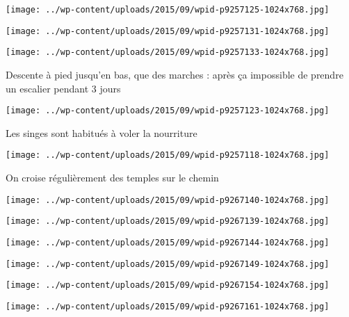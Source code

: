  \newline
\centerline{\texttt{[image: ../wp-content/uploads/2015/09/wpid-p9257125-1024x768.jpg]} } 
 \newline
 \newline
\centerline{\texttt{[image: ../wp-content/uploads/2015/09/wpid-p9257131-1024x768.jpg]} } 
 \newline
 \newline
\centerline{\texttt{[image: ../wp-content/uploads/2015/09/wpid-p9257133-1024x768.jpg]} } 
 \newline
 Descente à pied jusqu'en bas, que des marches : après ça impossible de prendre un escalier pendant 3 jours \newline
 \newline
\centerline{\texttt{[image: ../wp-content/uploads/2015/09/wpid-p9257123-1024x768.jpg]} } 
 \newline
 Les singes sont habitués à voler la nourriture \newline
 \newline
\centerline{\texttt{[image: ../wp-content/uploads/2015/09/wpid-p9257118-1024x768.jpg]} } 
 \newline
 On croise régulièrement des temples sur le chemin \newline
 \newline
\centerline{\texttt{[image: ../wp-content/uploads/2015/09/wpid-p9267140-1024x768.jpg]} } 
 \newline
 \newline
\centerline{\texttt{[image: ../wp-content/uploads/2015/09/wpid-p9267139-1024x768.jpg]} } 
 \newline
 \newline
\centerline{\texttt{[image: ../wp-content/uploads/2015/09/wpid-p9267144-1024x768.jpg]} } 
 \newline
 \newline
\centerline{\texttt{[image: ../wp-content/uploads/2015/09/wpid-p9267149-1024x768.jpg]} } 
 \newline
 \newline
\centerline{\texttt{[image: ../wp-content/uploads/2015/09/wpid-p9267154-1024x768.jpg]} } 
 \newline
 \newline
\centerline{\texttt{[image: ../wp-content/uploads/2015/09/wpid-p9267161-1024x768.jpg]} } 
 \newline
